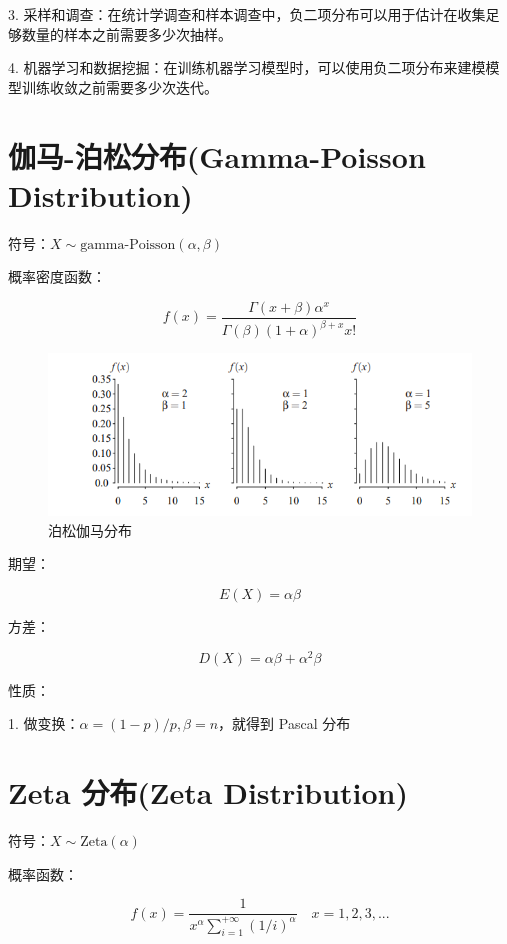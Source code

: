 \documentclass[12pt, a4paper, oneside]{ctexbook}
\begin{document}
3. 采样和调查：在统计学调查和样本调查中，负二项分布可以用于估计在收集足够数量的样本之前需要多少次抽样。

4. 机器学习和数据挖掘：在训练机器学习模型时，可以使用负二项分布来建模模型训练收敛之前需要多少次迭代。

\section{伽马-泊松分布(Gamma-Poisson Distribution)}

 符号：$X \sim \text{gamma-Poisson}(\alpha, \beta)$

 概率密度函数：

$$
f(x) = \dfrac{\Gamma(x + \beta) \alpha^{x}}{\Gamma(\beta)(1+\alpha)^{\beta + x}x!}
$$

\begin{figure}[H]
  \centering
  \includegraphics[width=1\textwidth]{image/泊松伽马分布.png}
  \caption{泊松伽马分布}
  \label{fig:example}
\end{figure}

 期望：

$$
E(X) = \alpha\beta
$$

 方差：

$$
D(X) = \alpha \beta + \alpha^{2}\beta
$$

 性质：

1. 做变换：$\alpha = (1 - p) / p, \beta = n$，就得到 Pascal 分布

\section{Zeta 分布(Zeta Distribution)}

 符号：$X \sim \text{Zeta}(\alpha)$

 概率函数：

$$
f(x) = \dfrac{1}{x^{\alpha}\sum\limits_{i = 1}^{+\infty}(1/i)^{\alpha}} \quad x = 1, 2, 3, ...
$$
\end{document}
